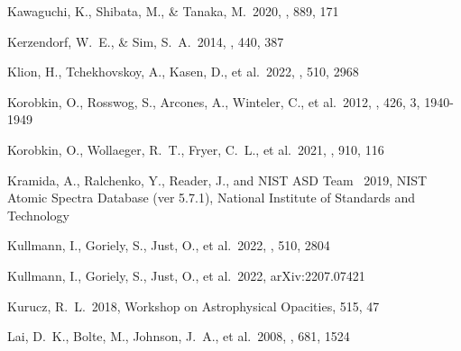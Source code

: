 \documentclass[twocolumn, twocolappendix]{aastex63}
\begin{document}
\begin{thebibliography}{}




 Kawaguchi, K., Shibata, M., \& Tanaka, M.\ 2020, \apj, 889, 171


 Kerzendorf, W.~E., \& Sim, S.~A.\ 2014, \mnras, 440, 387




 Klion, H., Tchekhovskoy, A., Kasen, D., et al.\ 2022, \mnras, 510, 2968


 Korobkin, O., Rosswog, S., Arcones, A., Winteler, C., et al.\ 2012, \mnras, 426, 3, 1940-1949


 Korobkin, O., Wollaeger, R.~T., Fryer, C.~L., et al.\ 2021, \apj, 910, 116


 Kramida, A., Ralchenko, Y., Reader, J., and {NIST ASD Team} \ 2019, NIST Atomic Spectra Database (ver 5.7.1), National Institute of Standards and Technology


 Kullmann, I., Goriely, S., Just, O., et al.\ 2022, \mnras, 510, 2804


 Kullmann, I., Goriely, S., Just, O., et al.\ 2022, arXiv:2207.07421




 Kurucz, R.~L.\ 2018, Workshop on Astrophysical Opacities, 515, 47





 Lai, D.~K., Bolte, M., Johnson, J.~A., et al.\ 2008, \apj, 681, 1524



\end{thebibliography}
\end{document}
